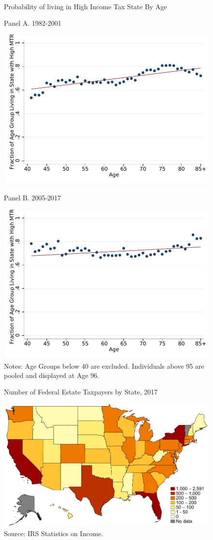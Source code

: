 \documentclass[12pt]{article}
\begin{document}
\begin{figure}
\centering
\caption{Probability of living in High Income Tax State By Age}
	\caption*{Panel A. 1982-2001}
	\includegraphics[width=.75\textwidth]{../Figures/FigureB4_a.pdf}
	\caption*{Panel B. 2005-2017}
	\includegraphics[width=.75\textwidth]{../Figures/FigureB4_b.pdf}
	\caption*{\footnotesize Notes: Age Groups below 40 are excluded. Individuals above 95 are pooled and displayed at Age 96.}
\label{fig:figa1}
\end{figure}
\clearpage



\begin{figure}
\centering
\caption{Number of Federal Estate Taxpayers by State, 2017}
\label{new8map}
	\includegraphics[width=.99\textwidth]{../Figures/FigureB5.pdf}
	\caption*{\footnotesize Source: IRS Statistics on Income.}
\end{figure}
\clearpage
\end{document}
